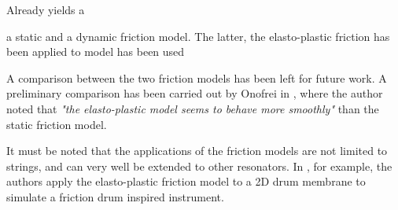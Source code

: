 Already yields a 

a static and a dynamic friction model. The latter, the elasto-plastic friction has been applied to model has been used 




A comparison between the two friction models has been left for future work. A preliminary comparison has been carried out by Onofrei in \cite{Onofrei2021}, where the author noted that \textit{"the
elasto-plastic model seems to behave more smoothly"} than the static friction model.

It must be noted that the applications of the friction models are not limited to strings, and can very well be extended to other resonators. In \cite{paper:Onofrei2021DAFx}, for example, the authors apply the elasto-plastic friction model to a 2D drum membrane to simulate a friction drum inspired instrument. 

